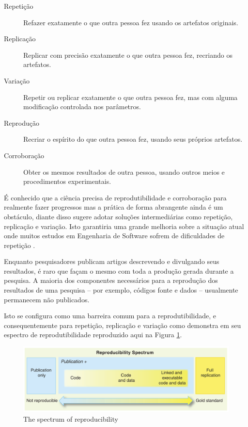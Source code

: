 \documentclass[qual, classic, a4paper]{ufbathesis}
\begin{document}

\begin{description}
  \item[Repetição] Refazer exatamente o que outra pessoa fez usando os artefatos originais.
  \item[Replicação] Replicar com precisão exatamente o que outra pessoa fez, recriando os artefatos.
  \item[Variação] Repetir ou replicar exatamente o que outra pessoa fez, mas com alguma modificação controlada nos parâmetros.
  \item[Reprodução] Recriar o espírito do que outra pessoa fez, usando seus próprios artefatos.
  \item[Corroboração] Obter os mesmos resultados de outra pessoa, usando outros meios e procedimentos experimentais.
\end{description}

É conhecido que a ciência precisa de reprodutibilidade e corroboração para
realmente fazer progressos mas a prática de forma abrangente ainda é um
obstáculo, diante disso  sugere adotar soluções
intermediárias como repetição, replicação e variação. Isto garantiria uma
grande melhoria sobre a situação atual onde muitos estudos em Engenharia de
Software sofrem de dificuldades de repetição \cite{Tang2016}.

Enquanto pesquisadores publicam artigos descrevendo e divulgando seus
resultados, é raro que façam o mesmo com toda a produção gerada durante a
pesquisa. A maioria dos componentes necessários para a reprodução dos
resultados de uma pesquisa -- por exemplo, códigos fonte e dados -- usualmente
permanecem não publicados.

Isto se configura como uma barreira comum para a reprodutibilidade, e
consequentemente para repetição, replicação e variação como demonstra
 em seu espectro de reprodutibilidade reproduzido aqui
na Figura \ref{reproducibility-spectrum}.


\begin{figure}[h]
  \center
  \includegraphics[scale=0.25]{imagens/reproducibility-spectrum.png}
  \caption{The spectrum of reproducibility\cite{Peng2011}}
  \label{reproducibility-spectrum}
\end{figure}
\end{document}
